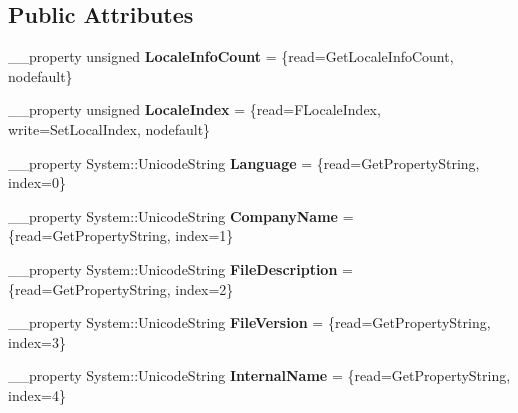\subsection*{Public Attributes}
\begin{DoxyCompactItemize}
\item 
\hypertarget{class_versioninfo_1_1_t_version_info_a4593bbda2e89e9e9488c973abee72b7f}{\+\_\+\+\_\+property unsigned {\bfseries Locale\+Info\+Count} = \{read=Get\+Locale\+Info\+Count, nodefault\}}\label{class_versioninfo_1_1_t_version_info_a4593bbda2e89e9e9488c973abee72b7f}

\item 
\hypertarget{class_versioninfo_1_1_t_version_info_a56c47ce2704221eb70e52c2a8e575df2}{\+\_\+\+\_\+property unsigned {\bfseries Locale\+Index} = \{read=F\+Locale\+Index, write=Set\+Local\+Index, nodefault\}}\label{class_versioninfo_1_1_t_version_info_a56c47ce2704221eb70e52c2a8e575df2}

\item 
\hypertarget{class_versioninfo_1_1_t_version_info_a7345c4b371103eac3d7f9ec6dc51ebe8}{\+\_\+\+\_\+property System\+::\+Unicode\+String {\bfseries Language} = \{read=Get\+Property\+String, index=0\}}\label{class_versioninfo_1_1_t_version_info_a7345c4b371103eac3d7f9ec6dc51ebe8}

\item 
\hypertarget{class_versioninfo_1_1_t_version_info_ab8d3badffea60ad879fe8fd49d74452d}{\+\_\+\+\_\+property System\+::\+Unicode\+String {\bfseries Company\+Name} = \{read=Get\+Property\+String, index=1\}}\label{class_versioninfo_1_1_t_version_info_ab8d3badffea60ad879fe8fd49d74452d}

\item 
\hypertarget{class_versioninfo_1_1_t_version_info_ad90a51231d10ad0c60d0aa6bfae7e8da}{\+\_\+\+\_\+property System\+::\+Unicode\+String {\bfseries File\+Description} = \{read=Get\+Property\+String, index=2\}}\label{class_versioninfo_1_1_t_version_info_ad90a51231d10ad0c60d0aa6bfae7e8da}

\item 
\hypertarget{class_versioninfo_1_1_t_version_info_a61f93a9727698191a3361272b58502c5}{\+\_\+\+\_\+property System\+::\+Unicode\+String {\bfseries File\+Version} = \{read=Get\+Property\+String, index=3\}}\label{class_versioninfo_1_1_t_version_info_a61f93a9727698191a3361272b58502c5}

\item 
\hypertarget{class_versioninfo_1_1_t_version_info_a8a154f1a7ddcbcf4fa5e25dffb2e392b}{\+\_\+\+\_\+property System\+::\+Unicode\+String {\bfseries Internal\+Name} = \{read=Get\+Property\+String, index=4\}}\label{class_versioninfo_1_1_t_version_info_a8a154f1a7ddcbcf4fa5e25dffb2e392b}


\end{DoxyCompactItemize}
